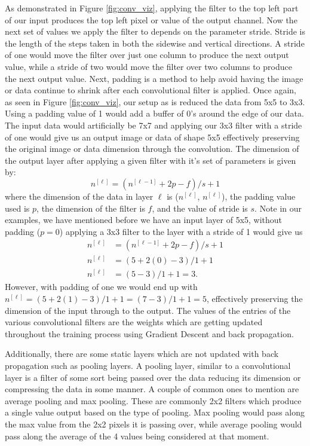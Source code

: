 \documentclass[11pt]{amsart}
\begin{document}
As demonstrated in Figure \ref{fig:conv_viz}, applying the filter to the top left part of our input produces the top left pixel or value of the output channel.
Now the next set of values we apply the filter to depends on the parameter stride.
Stride is the length of the steps taken in both the sidewise and vertical directions.
A stride of one would move the filter over just one column to produce the next output value, while a stride of two would move the filter over two columns to produce the next output value.
Next, padding is a method to help avoid having the image or data continue to shrink after each convolutional filter is applied.
Once again, as seen in Figure \ref{fig:conv_viz}, our setup as is reduced the data from 5x5 to 3x3.
Using a padding value of 1 would add a buffer of 0's around the edge of our data.
The input data would artificially be 7x7 and applying our 3x3 filter with a stride of one would give us an output image or data of shape 5x5 effectively preserving the original image or data dimension through the convolution.
The dimension of the output layer after applying a given filter with it's set of parameters is given by:
$$
n^{[\ell]} = (n^{[\ell - 1]} +2p - f)/s +1
$$
where the dimension of the data in layer $\ell$ is ($n^{[\ell]}$, $n^{[\ell]}$), the padding value used is $p$, the dimension of the filter is $f$, and the value of stride is $s$.
Note in our examples, we have mentioned before we have an input layer of 5x5, without padding ($p = 0$) applying a 3x3 filter to the layer with a stride of 1 would give us
\begin{align*}
n^{[\ell]} &= (n^{[\ell - 1]} +2p - f)/s +1 \\
n^{[\ell]} &= (5 +2(0) - 3)/1 +1 \\
n^{[\ell]} &= (5 - 3)/1 +1 = 3.
\end{align*}
However, with padding of one we would end up with $n^{[\ell]} = (5 +2(1) - 3)/1 +1 = (7 - 3)/1 + 1 = 5$, effectively preserving the dimension of the input through to the output.
The values of the entries of the various convolutional filters are the weights which are getting updated throughout the training process using Gradient Descent and back propagation.

Additionally, there are some static layers which are not updated with back propagation such as pooling layers.
A pooling layer, similar to a convolutional layer is a filter of some sort being passed over the data reducing its dimension or compressing the data in some manner.
A couple of common ones to mention are average pooling and max pooling.
These are commonly 2x2 filters which produce a single value output based on the type of pooling.
Max pooling would pass along the max value from the 2x2 pixels it is passing over, while average pooling would pass along the average of the 4 values being considered at that moment.
\end{document}
